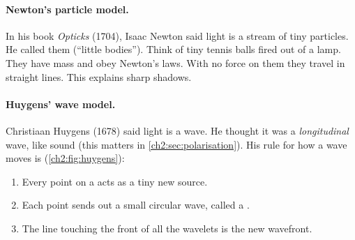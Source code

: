 \paragraph{Newton's particle model.} In his book \emph{Opticks} (1704), Isaac Newton said
light is a stream of tiny particles. He called them  (``little bodies'').
Think of tiny tennis balls fired out of a lamp. They have mass and obey Newton's laws.
With no force on them they travel in straight lines. This explains sharp shadows.

\begin{sidebyside}[0.62]
\paragraph{Huygens' wave model.} Christiaan Huygens (1678) said light is a wave. He
thought it was a \emph{longitudinal} wave, like sound (this matters in
\cref{ch2:sec:polarisation}). His rule for how a wave moves is  (\cref{ch2:fig:huygens}):
\begin{enumerate}
  \item Every point on a  acts as a tiny new source.
  \item Each point sends out a small circular wave, called a .
  \item The line touching the front of all the wavelets is the new wavefront.
\end{enumerate}
\nextside
  \centering
  \label{ch2:fig:huygens}
\end{sidebyside}

